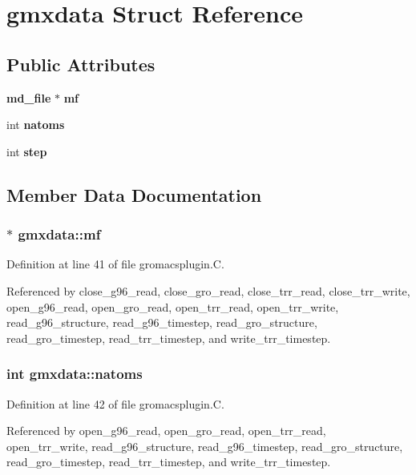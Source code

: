 \section{gmxdata  Struct Reference}
\label{structgmxdata}
\subsection*{Public Attributes}
\begin{CompactItemize}
\item 
{\bf md\_\-file} $\ast$ {\bf mf}
\item 
int {\bf natoms}
\item 
int {\bf step}
\end{CompactItemize}


\subsection{Member Data Documentation}
\subsubsection{$\ast$ gmxdata::mf}\label{structgmxdata_m0}




Definition at line 41 of file gromacsplugin.C.

Referenced by close\_\-g96\_\-read, close\_\-gro\_\-read, close\_\-trr\_\-read, close\_\-trr\_\-write, open\_\-g96\_\-read, open\_\-gro\_\-read, open\_\-trr\_\-read, open\_\-trr\_\-write, read\_\-g96\_\-structure, read\_\-g96\_\-timestep, read\_\-gro\_\-structure, read\_\-gro\_\-timestep, read\_\-trr\_\-timestep, and write\_\-trr\_\-timestep.
\subsubsection{\setlength{\rightskip}{0pt plus 5cm}int gmxdata::natoms}\label{structgmxdata_m1}




Definition at line 42 of file gromacsplugin.C.

Referenced by open\_\-g96\_\-read, open\_\-gro\_\-read, open\_\-trr\_\-read, open\_\-trr\_\-write, read\_\-g96\_\-structure, read\_\-g96\_\-timestep, read\_\-gro\_\-structure, read\_\-gro\_\-timestep, read\_\-trr\_\-timestep, and write\_\-trr\_\-timestep.
